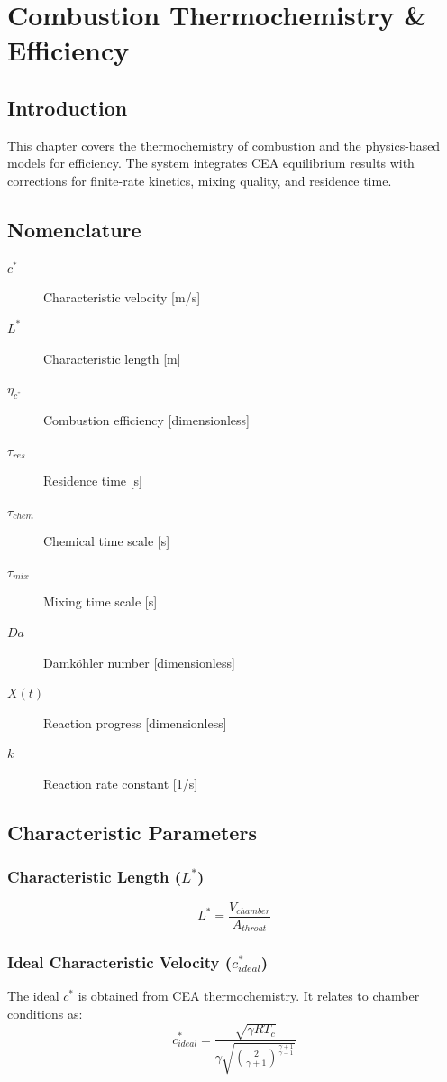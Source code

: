 \section{Combustion Thermochemistry \& Efficiency}

\subsection{Introduction}
This chapter covers the thermochemistry of combustion and the physics-based models for efficiency. The system integrates CEA equilibrium results with corrections for finite-rate kinetics, mixing quality, and residence time.

\subsection{Nomenclature}
\begin{description}
    \item[\(c^*\)] Characteristic velocity [\si{m/s}]
    \item[\(L^*\)] Characteristic length [\si{m}]
    \item[\(\eta_{c^*}\)] Combustion efficiency [dimensionless]
    \item[\(\tau_{res}\)] Residence time [\si{s}]
    \item[\(\tau_{chem}\)] Chemical time scale [\si{s}]
    \item[\(\tau_{mix}\)] Mixing time scale [\si{s}]
    \item[\(Da\)] Damköhler number [dimensionless]
    \item[\(X(t)\)] Reaction progress [dimensionless]
    \item[\(k\)] Reaction rate constant [\si{1/s}]
\end{description}

\subsection{Characteristic Parameters}

\subsubsection{Characteristic Length (\(L^*\))}
\begin{equation}
L^* = \frac{V_{chamber}}{A_{throat}}
\end{equation}

\subsubsection{Ideal Characteristic Velocity (\(c^*_{ideal}\))}
The ideal \(c^*\) is obtained from CEA thermochemistry. It relates to chamber conditions as:
\begin{equation}
c^*_{ideal} = \frac{\sqrt{\gamma R T_c}}{\gamma \sqrt{\left(\frac{2}{\gamma+1}\right)^{\frac{\gamma+1}{\gamma-1}}}}
\end{equation}

